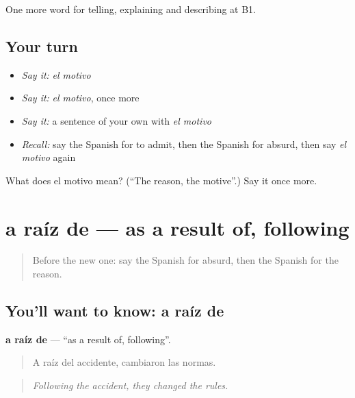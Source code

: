 \begin{grammarlens}[title={What you've built}]
One more word for telling, explaining and describing at B1.
\end{grammarlens}

\subsection*{Your turn}
\begin{itemize}
\raggedright
  \item \emph{Say it:} \emph{el motivo}
  \item \emph{Say it:} \emph{el motivo}, once more
  \item \emph{Say it:} a sentence of your own with \emph{el motivo}
  \item \emph{Recall:} say the Spanish for to admit, then the Spanish for absurd, then say \emph{el motivo} again
\end{itemize}

\begin{tcolorbox}[breakable,colback=teal!4,colframe=teal!35!black,title={Before you move on}]
What does el motivo mean? (\textquotedblleft{}The reason, the motive\textquotedblright{}.) Say it once more.
\end{tcolorbox}
\section[a raíz de]{a raíz de — as a result of, following}

\label{lesson:ES-C580-a-raiz-de}



\begin{quote}
Before the new one: say the Spanish for absurd, then the Spanish for the reason.
\end{quote}

\subsection*{You'll want to know: a raíz de}
\textbf{a raíz de} — \textquotedblleft{}as a result of, following\textquotedblright{}.

\begin{quote}
A raíz del accidente, cambiaron las normas.
\end{quote}

\begin{quote}
\emph{Following the accident, they changed the rules.}
\end{quote}

